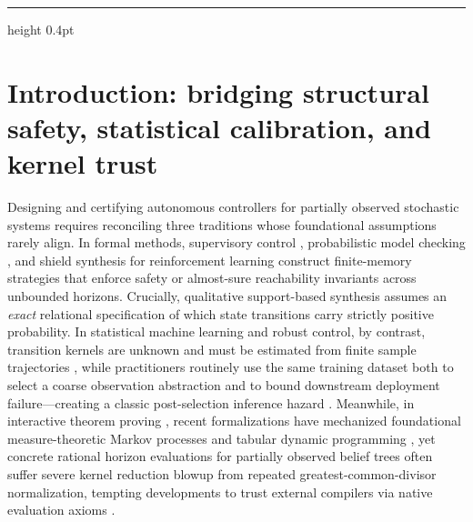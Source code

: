 \documentclass[11pt,a4paper]{article}
\begin{document}
\par
\vspace{3pt}
\par
\vspace{3pt}
\par
\vspace{8pt}
\hrule height 0.4pt
\vspace{10pt}

\section{Introduction: bridging structural safety, statistical
calibration, and kernel
trust}\label{introduction-bridging-structural-safety-statistical-calibration-and-kernel-trust}

Designing and certifying autonomous controllers for partially observed
stochastic systems requires reconciling three traditions whose
foundational assumptions rarely align. In formal methods, supervisory
control \citep{ramadgeWonham1987, tabuada2009, cassandrasLafortune2021},
probabilistic model checking
\citep{baierKatoen2008, kwiatkowska2011, dehnert2017}, and shield
synthesis for reinforcement learning
\citep{chatterjee2016, alshiekh2018, junges2021} construct finite-memory
strategies that enforce safety or almost-sure reachability invariants
across unbounded horizons. Crucially, qualitative support-based
synthesis assumes an \emph{exact} relational specification of which
state transitions carry strictly positive probability. In statistical
machine learning and robust control, by contrast, transition kernels are
unknown and must be estimated from finite sample trajectories
\citep{kearnsSingh2002, strehl2009, nilimElGhaoui2005, wiesemann2013},
while practitioners routinely use the same training dataset both to
select a coarse observation abstraction
\citep{ravindranBarto2004, ferns2004} and to bound downstream deployment
failure---creating a classic post-selection inference hazard
\citep{berk2013, mayo2018}. Meanwhile, in interactive theorem proving
\citep{nipkowPaulsonWenzel2002, bertotCasteran2004, mouraUllrich2021},
recent formalizations have mechanized foundational measure-theoretic
Markov processes and tabular dynamic programming
\citep{hoelzl2017, vajjha2021, schaeffelerAbdulaziz2023}, yet concrete
rational horizon evaluations for partially observed belief trees often
suffer severe kernel reduction blowup from repeated
greatest-common-divisor normalization, tempting developments to trust
external compilers via native evaluation axioms \citep{boespflug2011}.
\end{document}
